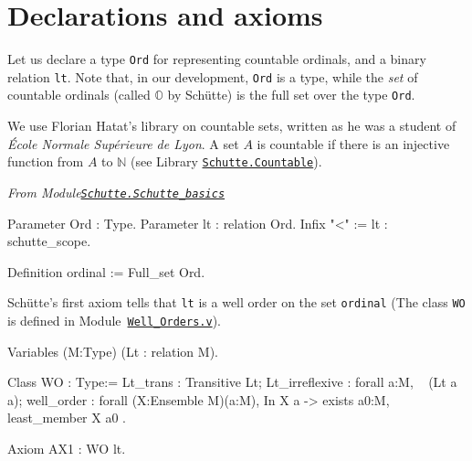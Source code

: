 \section{Declarations and axioms}

Let us declare a type 
\texttt{Ord} for representing countable ordinals, and a binary relation
 \texttt{lt}. Note that, in our development, \texttt{Ord} is a type, while the \emph{set} of countable ordinals (called $\mathbb{O}$ by Schütte) 
is the full set over the type \texttt{Ord}.

\label{types:Ord} 

We use Florian Hatat's library on countable sets, written as he was a student of  \emph{\'Ecole Normale Supérieure de Lyon}. A set $A$ is countable if there is an injective function from $A$ to $\mathbb{N}$ (see 
Library \href{../theories/html/hydras.Schutte.Countable.html}%
{\texttt{Schutte.Countable}}).


\vspace{6pt}

\emph{From Module\href{../theories/html/hydras.Schutte.Schutte_basics.html}%
{\texttt{Schutte.Schutte\_basics}}}


\begin{Coqsrc}
Parameter Ord : Type.
Parameter lt : relation Ord.
Infix "<" := lt : schutte_scope.

Definition ordinal := Full_set Ord.
\end{Coqsrc}

Schütte's first axiom tells that \texttt{lt} is a well order on the set 
\texttt{ordinal} (The  class \texttt{WO} is defined in
Module~\href{../theories/html/hydras.Schutte.Well_Orders.html}%
{\texttt{Well\_Orders.v}}).


\label{types:WO}

\begin{Coqsrc}
Variables (M:Type)
         (Lt : relation M).
  
Class WO : Type:=
    {
      Lt_trans : Transitive  Lt;
      Lt_irreflexive : forall a:M, ~ (Lt a a);
      well_order : forall (X:Ensemble M)(a:M),
          In X a ->
          exists a0:M, least_member  X a0
    }.
\end{Coqsrc}



\begin{Coqsrc}
  Axiom AX1 : WO lt.
\end{Coqsrc}

